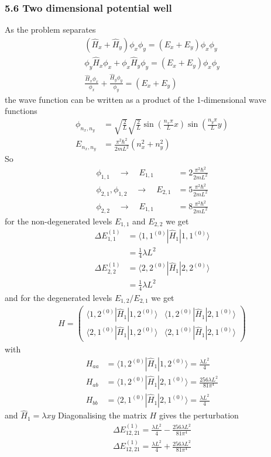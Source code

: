 \documentclass[10pt,a4paper]{book}
\theoremstyle{definition}
\begin{document}
\subsubsection{5.6 Two dimensional potential well}
As the problem separates 
\begin{align}
\left(\hat{H}_x+\hat{H}_y\right)\phi_x\phi_y=(E_x+E_y)\phi_x\phi_y\\
\phi_y\hat{H}_x\phi_x+\phi_x\hat{H}_y\phi_y=(E_x+E_y)\phi_x\phi_y\\
\frac{\hat{H}_x\phi_x}{\phi_x}+\frac{\hat{H}_y\phi_y}{\phi_y}=(E_x+E_y)
\end{align}
the wave function can be written as a product of the 1-dimensional wave functions
\begin{align}
\phi_{n_x,n_y}&=\sqrt{\frac{2}{L}}\sqrt{\frac{2}{L}}\sin\left(\frac{n_x\pi}{L}x\right)\sin\left(\frac{n_y\pi}{L}y\right)\\
E_{n_x,n_y}&=\frac{\pi^2\hbar^2}{2mL^2}(n_x^2+n_y^2)
\end{align}
So 
\begin{align}
\phi_{1,1}\quad\rightarrow\quad E_{1,1}&=2\frac{\pi^2\hbar^2}{2mL^2}\\
\phi_{2,1},\phi_{1,2}\quad\rightarrow\quad E_{2,1}&=5\frac{\pi^2\hbar^2}{2mL^2}\\
\phi_{2,2}\quad\rightarrow\quad E_{1,1}&=8\frac{\pi^2\hbar^2}{2mL^2}
\end{align}
for the non-degenerated levels $E_{1,1}$ and $E_{2,2}$ we get
\begin{align}
\Delta E_{1,1}^{(1)}&=\langle 1,1^{(0)}|\hat{H}_1|1,1^{(0)}\rangle\\
&=\frac{1}{4}\lambda L^2\\
\Delta E_{2,2}^{(1)}&=\langle 2,2^{(0)}|\hat{H}_1|2,2^{(0)}\rangle\\
&=\frac{1}{4}\lambda L^2
\end{align}
and for the degenerated levels $E_{1,2}/E_{2,1}$ we get
\begin{align}
H=
\begin{pmatrix}
\langle 1,2^{(0)}|\hat{H}_1|1,2^{(0)}\rangle & \langle 1,2^{(0)}|\hat{H}_1|2,1^{(0)}\rangle\\
\langle 2,1^{(0)}|\hat{H}_1|1,2^{(0)}\rangle & \langle 2,1^{(0)}|\hat{H}_1|2,1^{(0)}\rangle
\end{pmatrix}
\end{align}
with
\begin{align}
H_{aa}&=\langle 1,2^{(0)}|\hat{H}_1|1,2^{(0)}\rangle=\frac{\lambda L^2}{4}\\
H_{ab}&=\langle 1,2^{(0)}|\hat{H}_1|2,1^{(0)}\rangle=\frac{256\lambda L^2}{81\pi^4}\\
H_{bb}&=\langle 2,1^{(0)}|\hat{H}_1|2,1^{(0)}\rangle=\frac{\lambda L^2}{4}
\end{align}
and $\hat{H}_1=\lambda x y$ Diagonalising the matrix $H$ gives the perturbation
\begin{align}
\Delta E_{12,21}^{(1)}=\frac{\lambda L^2}{4}-\frac{256\lambda L^2}{81\pi^4}\\
\Delta E_{12,21}^{(1)}=\frac{\lambda L^2}{4}+\frac{256\lambda L^2}{81\pi^4}\\
\end{align}
\end{document}
